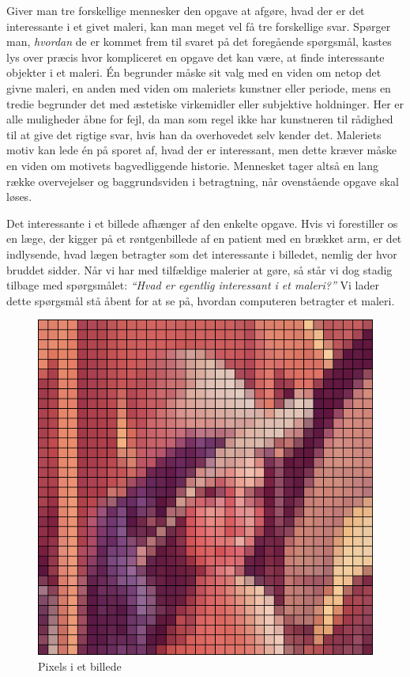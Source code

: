 {
Giver man tre forskellige mennesker den opgave at afgøre, hvad der er
det interessante i et givet maleri, kan man meget vel få tre forskellige
svar. Spørger man, \emph{hvordan} de er kommet frem til svaret på det
foregående spørgsmål, kastes lys over præcis hvor kompliceret en opgave
det kan være, at finde interessante objekter i et maleri. Én begrunder
måske sit valg med en viden om netop det givne maleri, en anden med
viden om maleriets kunstner eller periode, mens en tredie begrunder det
med æstetiske virkemidler eller subjektive holdninger. Her er alle
muligheder åbne for fejl, da man som regel ikke har kunstneren til
rådighed til at give det rigtige svar, hvis han da overhovedet selv
kender det.  Maleriets motiv kan lede én på sporet af, hvad der er
interessant, men dette kræver måske en viden om motivets bagvedliggende
historie.  Mennesket tager altså en lang række overvejelser og
baggrundsviden i betragtning, når ovenstående opgave skal løses.

Det interessante i et billede afhænger af den enkelte opgave.  Hvis vi
forestiller os en læge, der kigger på et røntgenbillede af en patient
med en brækket arm, er det indlysende, hvad lægen betragter som det
interessante i billedet, nemlig der hvor bruddet sidder. Når vi har med
tilfældige malerier at gøre, så står vi dog stadig tilbage med
spørgsmålet: \emph{``Hvad er egentlig \emph{interessant} i et maleri?''}
Vi lader dette spørgsmål stå åbent for at se på, hvordan computeren
betragter et maleri.

\begin{figure}[b]
    \centering
    \includegraphics[scale=0.3]{afsnit/baggrund/billeder/pixel_lena}
    \caption[]{Pixels i et billede}
    \label{pixel_lena}
\end{figure}

}
